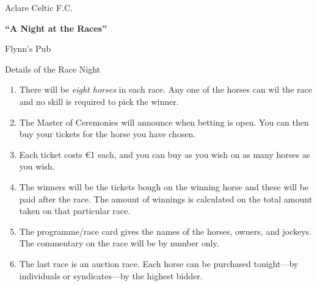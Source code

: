 \documentclass[12pt,a4paper]{article}
\newcommand{\hdr}[1]{\newpage\begin{center}\Huge\sc #1\par\vspace{1em}\end{center}}
\newcounter{race}
\newcounter{horse}
\begin{document}
\pagestyle{empty}
\begin{center}
\vspace*{10em}

{\Large\sc Aclare Celtic F.C. \par}
\vspace{2em}{\sc present\par}\vspace{2em}
{\LARGE\bf ``A Night at the Races''\par}
\vspace{2em}{\sc to be held in\par}\vspace{2em}
{\Large\sc Flynn's Pub\par}
\vspace{2em}{\sc on Friday, 28th December 2007\par}
\end{center}

\hdr{Details of the Race Night}
\begin{large}
\begin{enumerate}
\item There will be \emph{eight horses} in each race. Any one of the horses
      can wil the race and no skill is required to pick the winner.
\item The Master of Ceremonies will announce when betting is open. You
      can then buy your tickets for the horse you have chosen.
\item Each ticket costs \euro{}1 each, and you can buy as you wish on as many
      horses as you wish.
\item The winners will be the tickets bough on the winning horse and these
      will be paid after the race. The amount of winnings is calculated on
      the total amount taken on that particular race.
\item The programme/race card gives the names of the horses, owners, and
      jockeys. The commentary on the race will be by number only.
\item The last race is an auction race. Each horse can be purchased
      tonight---by individuals or syndicates---by the highest bidder.
\end{enumerate}
\end{large}
\vspace{2em}
\end{document}
